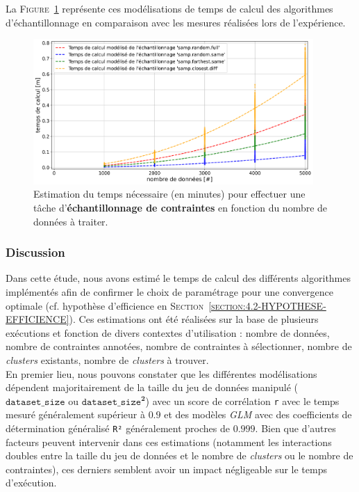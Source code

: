 			La \textsc{Figure~\ref{figure:4.3.2-ETUDE-COUTS-TEMPS-CALCUL-MODELISATION-SAMPLING}} représente ces modélisations de temps de calcul des algorithmes d'échantillonnage en comparaison avec les mesures réalisées lors de l'expérience.
			\newline
			\begin{figure}[!htb]
				\centering
				\includegraphics[width=0.95\textwidth]{figures/etude-temps-calcul-modelisation-4samp}
				\caption{
					Estimation du temps nécessaire (en minutes) pour effectuer une tâche d'\textbf{échantillonnage de contraintes} en fonction du nombre de données à traiter.
				}
				\label{figure:4.3.2-ETUDE-COUTS-TEMPS-CALCUL-MODELISATION-SAMPLING}
			\end{figure}

		\subsubsection{Discussion}
		
			Dans cette étude, nous avons estimé le temps de calcul des différents algorithmes implémentés afin de confirmer le choix de paramétrage pour une convergence optimale (cf. hypothèse d'efficience en \textsc{Section~\ref{section:4.2-HYPOTHESE-EFFICIENCE}}).
			Ces estimations ont été réalisées sur la base de plusieurs exécutions et fonction de divers contextes d'utilisation : nombre de données, nombre de contraintes annotées, nombre de contraintes à sélectionner, nombre de \textit{clusters} existants, nombre de \textit{clusters} à trouver.
			\\
			
			En premier lieu, nous pouvons constater que les différentes modélisations dépendent majoritairement de la taille du jeu de données manipulé ($\texttt{dataset\_size}$ ou $\texttt{dataset\_size}^{\textbf{2}}$) avec un score de corrélation \texttt{r} avec le temps mesuré généralement supérieur à $0.9$ et des modèles \textit{GLM} avec des coefficients de détermination généralisé \texttt{R²} généralement proches de $0.999$.
			Bien que d'autres facteurs peuvent intervenir dans ces estimations (notamment les interactions doubles entre la taille du jeu de données et le nombre de \textit{clusters} ou le nombre de contraintes), ces derniers semblent avoir un impact négligeable sur le temps d'exécution.
			
